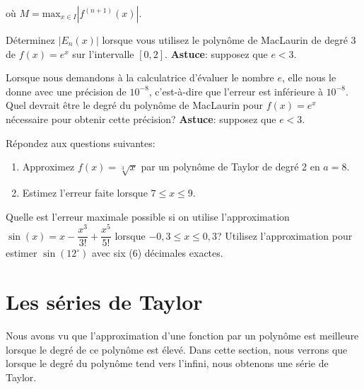 \documentclass[]{book}
\providecommand{\tightlist}{%
  \setlength{\itemsep}{0pt}\setlength{\parskip}{0pt}}
\theoremstyle{definition}
\theoremstyle{definition}
\theoremstyle{definition}
\theoremstyle{remark}
\let\BeginKnitrBlock\begin \let\EndKnitrBlock\end
\begin{document}
où \(M=\text{max}_{x\in I}\left\vert f^{(n+1)}(x) \right\vert\).

\BeginKnitrBlock{example}
\protect\hypertarget{exm:unnamed-chunk-10}{}{\label{exm:unnamed-chunk-10}
}Déterminez \(|E_n(x)|\) lorsque vous utilisez le polynôme de MacLaurin
de degré \(3\) de \(f(x)=e^x\) sur l'intervalle \([0,2]\).
\textbf{Astuce}: supposez que \(e<3\). \vspace*{10cm}
\EndKnitrBlock{example}

\BeginKnitrBlock{example}
\protect\hypertarget{exm:unnamed-chunk-11}{}{\label{exm:unnamed-chunk-11}
}Lorsque nous demandons à la calculatrice d'évaluer le nombre \(e\),
elle nous le donne avec une précision de \(10^{-8}\), c'est-à-dire que
l'erreur est inférieure à \(10^{-8}\). Quel devrait être le degré du
polynôme de MacLaurin pour \(f(x)=e^x\) nécessaire pour obtenir cette
précision? \textbf{Astuce}: supposez que \(e<3\). \vspace*{10cm}
\EndKnitrBlock{example}

\BeginKnitrBlock{example}
\protect\hypertarget{exm:unnamed-chunk-12}{}{\label{exm:unnamed-chunk-12}
}Répondez aux questions suivantes:

\begin{enumerate}
\def\labelenumi{\alph{enumi})}
\tightlist
\item
  Approximez \(f(x)=\sqrt[3]{x}\) par un polynôme de Taylor de degré 2
  en \(a=8\).
\item
  Estimez l'erreur faite lorsque \(7\leq x \leq 9\).
\end{enumerate}

\vspace*{10cm}
\EndKnitrBlock{example}

\BeginKnitrBlock{example}
\protect\hypertarget{exm:unnamed-chunk-13}{}{\label{exm:unnamed-chunk-13}
}Quelle est l'erreur maximale possible si on utilise l'approximation
\(\sin(x)=x-\dfrac{x^3}{3!}+\dfrac{x^5}{5!}\) lorsque
\(-0,3\leq x \leq 0,3\)? Utilisez l'approximation pour estimer
\(\sin(12^{\circ})\) avec six (6) décimales exactes. \vspace*{10cm}
\EndKnitrBlock{example}

\hypertarget{les-series-de-taylor}{%
\section{Les séries de Taylor}\label{les-series-de-taylor}}

Nous avons vu que l'approximation d'une fonction par un polynôme est
meilleure lorsque le degré de ce polynôme est élevé. Dans cette section,
nous verrons que lorsque le degré du polynôme tend vers l'infini, nous
obtenons une série de Taylor.
\end{document}
